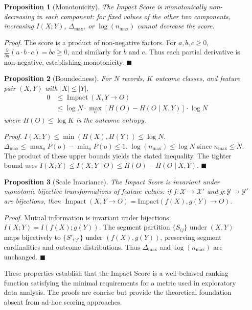 \documentclass[conference]{IEEEtran}
\newtheorem{proposition}{Proposition}
\begin{document}
\begin{proposition}[Monotonicity]
\label{prop:monotonicity}
The Impact Score is monotonically non-decreasing in each component: for fixed values of the other two components, increasing $I(X;Y)$, $\Delta_{\max}$, or $\log(n_{\max})$ cannot decrease the score.
\end{proposition}

\textit{Proof.} The score is a product of non-negative factors. For $a,b,c \geq 0$, $\frac{\partial}{\partial a}(a \cdot b \cdot c) = bc \geq 0$, and similarly for $b$ and $c$. Thus each partial derivative is non-negative, establishing monotonicity. \hfill $\blacksquare$

\begin{proposition}[Boundedness]
\label{prop:boundedness}
For $N$ records, $K$ outcome classes, and feature pair $(X,Y)$ with $|X| \leq |Y|$,
\[
\begin{aligned}
0 &\leq \operatorname{Impact}(X,Y \to O) \\
  &\leq \log N \cdot \max_{o}[H(O) - H(O \mid X,Y)] \cdot \log N
\end{aligned}
\]
where $H(O) \leq \log K$ is the outcome entropy.
\end{proposition}

\textit{Proof.} $I(X;Y) \leq \min(H(X), H(Y)) \leq \log N$. $\Delta_{\max} \leq \max_o P(o) - \min_o P(o) \leq 1$. $\log(n_{\max}) \leq \log N$ since $n_{\max} \leq N$. The product of these upper bounds yields the stated inequality. The tighter bound uses $I(X;Y) \leq I(X;Y \mid O) \leq H(O) - H(O \mid X,Y)$. \hfill $\blacksquare$

\begin{proposition}[Scale Invariance]
\label{prop:invariance}
The Impact Score is invariant under monotonic bijective transformations of feature values: if $f: \mathcal{X} \to \mathcal{X}'$ and $g: \mathcal{Y} \to \mathcal{Y}'$ are bijections, then $\operatorname{Impact}(X,Y \to O) = \text{Impact}(f(X), g(Y) \to O)$.
\end{proposition}

\textit{Proof.} Mutual information is invariant under bijections: $I(X;Y) = I(f(X); g(Y))$. The segment partition $\{S_{ij}\}$ under $(X,Y)$ maps bijectively to $\{S'_{i'j'}\}$ under $(f(X), g(Y))$, preserving segment cardinalities and outcome distributions. Thus $\Delta_{\max}$ and $\log(n_{\max})$ are unchanged. \hfill $\blacksquare$

These properties establish that the Impact Score is a well-behaved ranking function satisfying the minimal requirements for a metric used in exploratory data analysis. The proofs are concise but provide the theoretical foundation absent from ad-hoc scoring approaches.
\end{document}
